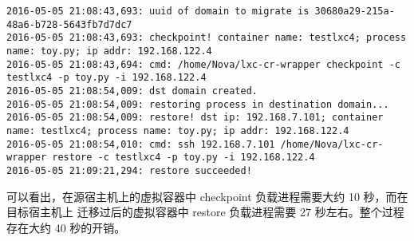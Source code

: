 \begin{lstlisting}
2016-05-05 21:08:43,693: uuid of domain to migrate is 30680a29-215a-48a6-b728-5643fb7d7dc7
2016-05-05 21:08:43,693: checkpoint! container name: testlxc4; process name: toy.py; ip addr: 192.168.122.4
2016-05-05 21:08:43,694: cmd: /home/Nova/lxc-cr-wrapper checkpoint -c testlxc4 -p toy.py -i 192.168.122.4
2016-05-05 21:08:54,009: dst domain created.
2016-05-05 21:08:54,009: restoring process in destination domain...
2016-05-05 21:08:54,009: restore! dst ip: 192.168.7.101; container name: testlxc4; process name: toy.py; ip addr: 192.168.122.4
2016-05-05 21:08:54,010: cmd: ssh 192.168.7.101 /home/Nova/lxc-cr-wrapper restore -c testlxc4 -p toy.py -i 192.168.122.4
2016-05-05 21:09:21,294: restore succeeded!
\end{lstlisting}

可以看出，在源宿主机上的虚拟容器中 checkpoint 负载进程需要大约 10 秒，而在目标宿主机上
迁移过后的虚拟容器中 restore 负载进程需要 27 秒左右。整个过程存在大约 40 秒的开销。

